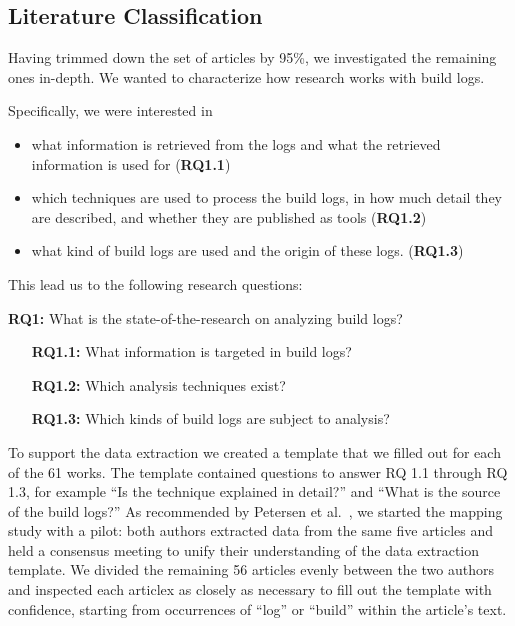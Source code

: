 \subsection{Literature Classification}
Having trimmed down the set of articles by 95\%, we investigated the
remaining ones in-depth.
We wanted to characterize how research works with build logs.

Specifically, we were interested in
\begin{itemize}
  \item what information is retrieved from the logs and
  what the retrieved information is used for (\textbf{RQ1.1})
  \item which techniques are used to process the build logs,
  in how much detail they are described, and whether they are published
  as tools (\textbf{RQ1.2})
  \item what kind of build logs are used and the origin of these
  logs.
(\textbf{RQ1.3})
\end{itemize}

This lead us to the following research questions:
\begin{simplebox}[attach boxed title to top center={yshift=-6mm}]
{\textbf{RQ1:} What is the state-of-the-research on analyzing build logs?}
\begin{itemize}[leftmargin=1cm]
  \item[\textbf{RQ1.1:}] What information is targeted in build logs?
  \item[\textbf{RQ1.2:}] Which analysis techniques exist?
  \item[\textbf{RQ1.3:}] Which kinds of build logs are subject to
  analysis?
\end{itemize}
\end{simplebox}

To support the data extraction we created a template that we filled out
for each of the 61 works.
The template contained questions to answer RQ 1.1 through RQ 1.3,
for example ``Is the technique explained in detail?'' and
``What is the source of the build logs?''
As recommended by Petersen et
al.~\cite{petersen2015guidelines}, we started the mapping study with a
pilot:
both authors extracted data from the same five articles and held a
consensus meeting to unify their understanding
of the data extraction template.
We divided the remaining 56 articles evenly between the two authors
and inspected each articlex as closely as necessary to fill out the
template
with confidence,
starting from occurrences of ``log'' or ``build'' within the article's
text.

